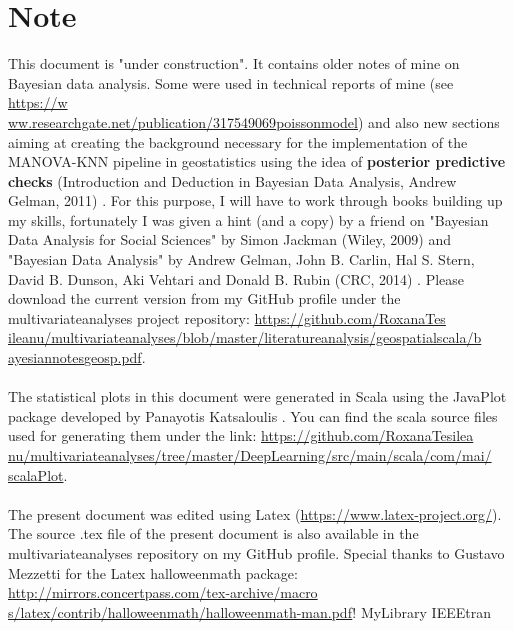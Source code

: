 \documentclass {article}
\begin{document}
\section* {Note}
This document is "under construction".
 It contains older notes of mine on Bayesian data analysis.
 Some were used in technical reports of mine (see \href{https://www.researchgate.net/publication/317549069_poisson_model}{https://w\\ww.researchgate.net/publication/317549069\underline{\space}poisson\underline{\space}model}) and also new sections aiming at creating the background necessary for the implementation of the MANOVA-KNN pipeline in geostatistics using the idea of \textbf{posterior predictive checks} (Introduction and Deduction in Bayesian Data Analysis, Andrew Gelman, 2011) \cite{gelman_introduction_2011}.
 For this purpose, I will have to work through books building up my skills, fortunately I was given a hint (and a copy) by a friend on "Bayesian Data Analysis for Social Sciences" by Simon Jackman (Wiley, 2009) \cite{jackman_bayesian_2009} and "Bayesian Data Analysis" by Andrew Gelman, John B. Carlin, Hal S. Stern, David B. Dunson, Aki Vehtari and Donald B. Rubin (CRC, 2014) \cite{gelman_bayesian_2014}.    
Please download the current version from  my GitHub profile under the multivariate\underline{\space}analyses project repository: \href{https://github.com/RoxanaTesileanu/multivariate_analyses/blob/master/literature_analysis/geospatial_scala/bayesian_notes_geosp.tex}{https://github.com/RoxanaTes\\ileanu/multivariate\underline{\space}analyses/blob/master/literature\underline{\space}analysis/geospatial\underline{\space}scala/b\\ayesian\underline{\space}notes\underline{\space}geosp.pdf}. 
\\
\\
The statistical plots in this document were generated in Scala using the JavaPlot package developed by Panayotis Katsaloulis \cite{panayotis_javaplot_2017}. You can find the scala source files used for generating them under the link: 
\href{https://github.com/RoxanaTesileanu/multivariate_analyses/tree/master/DeepLearning/src/main/scala/com/mai/scalaPlot}{https://github.com/RoxanaTesilea\\nu/multivariate\underline{\space}analyses/tree/master/DeepLearning/src/main/scala/com/mai/\\scalaPlot}.  
\\
\\
The present document was edited using Latex \cite{claudio_latex-tutorial.com_nodate} (\href{https://www.latex-project.org/}{https://www.latex-project.org/}). The source .tex file of the present document is also available in the multivariate\underline{\space}analyses repository on my GitHub profile. Special thanks to Gustavo Mezzetti for the Latex halloweenmath package:
\href{http://mirrors.concertpass.com/tex-archive/macros/latex/contrib/halloweenmath/halloweenmath-man.pdf}{http://mirrors.concertpass.com/tex-archive/macro\\s/latex/contrib/halloweenmath/halloweenmath-man.pdf}!  
 {MyLibrary}
 {IEEEtran}
\end{document}
